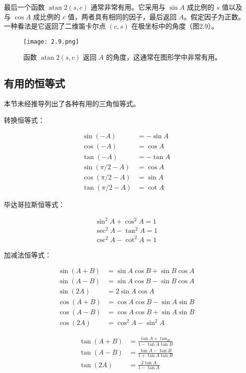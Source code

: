 \documentclass[lang=cn,12pt]{elegantbook}
\begin{document}
最后一个函数 $\operatorname{atan} 2(s,c)$ 通常非常有用。它采用与 $\sin A$ 成比例的 $s$ 值以及与 $\cos A$ 成比例的 $c$ 值，两者具有相同的因子，最后返回 $A$。假定因子为正数。一种看法是它返回了二维笛卡尔点 $(c,s)$ 在极坐标中的角度（图2.9）。

\begin{figure}[htbp]
\centering
\texttt{[image: 2.9.png]}
\caption{函数 $\operatorname{atan} 2(s,c)$ 返回 $A$ 的角度，这通常在图形学中非常有用。}
\end{figure}

\subsection{有用的恒等式}

本节未经推导列出了各种有用的三角恒等式。

转换恒等式：

$$
\begin{aligned}
\sin (-A) &=-\sin A \\
\cos (-A) &=\cos A \\
\tan (-A) &=-\tan A \\
\sin (\pi / 2-A) &=\cos A \\
\cos (\pi / 2-A) &=\sin A \\
\tan (\pi / 2-A) &=\cot A
\end{aligned}
$$

毕达哥拉斯恒等式：

$$
\begin{array}{r}
\sin ^{2} A+\cos ^{2} A=1 \\
\sec ^{2} A-\tan ^{2} A=1 \\
\csc ^{2} A-\cot ^{2} A=1
\end{array}
$$

加减法恒等式：

$$
\begin{aligned}
\sin (A+B) &=\sin A \cos B+\sin B \cos A \\
\sin (A-B) &=\sin A \cos B-\sin B \cos A \\
\sin (2 A) &=2 \sin A \cos A \\
\cos (A+B) &=\cos A \cos B-\sin A \sin B \\
\cos (A-B) &=\cos A \cos B+\sin A \sin B \\
\cos (2 A) &=\cos ^{2} A-\sin ^{2} A
\end{aligned}
$$

$$
\begin{aligned}
\tan (A+B) &=\frac{\tan A+\tan _{B}}{1-\tan A \tan B} \\
\tan (A-B) &=\frac{\tan A-\tan B}{1+\tan A \tan B} \\
\tan (2 A) &=\frac{2 \tan A}{1  -\tan A}
\end{aligned}
$$
\end{document}
